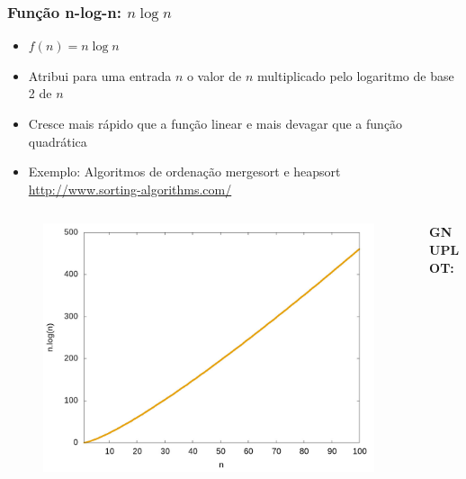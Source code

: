 \documentclass[aspectratio=169]{beamer}
\begin{document}
\begin{frame}\frametitle{Função n-log-n: $n \log n$}	
\begin{itemize}
	\item $f(n) = n \log n$
	\item Atribui para uma entrada $n$ o valor de $n$ multiplicado pelo logaritmo de base 2 de $n$
	\item Cresce mais rápido que a função linear e mais devagar que a função quadrática
	\item Exemplo: Algoritmos de ordenação mergesort e heapsort\\\url{http://www.sorting-algorithms.com/}
\end{itemize}
\vspace{-5mm}
\begin{columns}[T]
\begin{column}{0.6\linewidth}
\begin{figure}[h]
	\centering
	\includegraphics[height=0.5\paperheight]{graficos/n_log_n.jpg}
\end{figure}
\end{column}
\begin{column}{0.4\linewidth}
\vspace{5mm}
{\fontsize{0}{4}\selectfont{}\textbf{GNUPLOT:}

}
\end{column}
\end{columns}
\end{frame}
\end{document}
